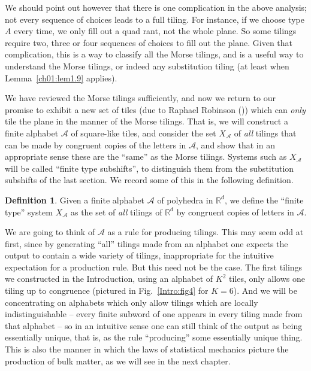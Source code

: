 \documentclass[reqno]{stml-l}
\theoremstyle{plain}
\theoremstyle{definition}
\newtheorem{definition}[theorem]{Definition}
\numberwithin{equation}{chapter}
\begin{document}
We should point out however that there is one complication in the above analysis; not every sequence of choices leads to a full tiling. For instance, if we choose type $A$ every time, we only fill out a quad rant, not the whole plane. So some tilings require two, three or four sequences of choices to fill out the plane. Given that complication, this is a way to classify all the Morse tilings, and is a useful way to understand the Morse tilings, or indeed any substitution tiling (at least when Lemma~\ref{ch01:lem1.9} applies).

We have reviewed the Morse tilings sufficiently, and now we return to our promise to exhibit a new set of tiles (due to Raphael Robinson (\cite{bib:Rob,bib:GrS})) which can \emph{only} tile the plane in the manner of the Morse tilings. That is, we will construct a finite alphabet $\mathcal{A}$ of square-like tiles, and consider the set $X_{\mathcal{A}}$ of \emph{all} tilings that can be made by congruent copies of the letters in $\mathcal{A}$, and show that in an appropriate sense these are the ``same'' as the Morse tilings. Systems such as $X_{\mathcal{A}}$ will be called ``finite type subshifts'', to distinguish them from the substitution subshifts of the last section. We record some of this in the following definition.

\begin{definition}\label{ch01:def1.9}
Given a finite alphabet $\mathcal{A}$ of polyhedra in $\mathbb{R}^{d}$, we define the ``finite type'' system $X_{\mathcal{A}}$ as the set of \emph{all} tilings of $\mathbb{R}^{d}$ by congruent copies of letters in $\mathcal{A}$.
\end{definition}

We are going to think of $\mathcal{A}$ as a rule for producing tilings. This may seem odd at first, since by generating ``all'' tilings made from an alphabet one expects the output to contain a wide variety of tilings, inappropriate for the intuitive expectation for a production rule. But this need not be the case. The first tilings we constructed in the Introduction, using an alphabet of $K^{2}$ tiles, only allows one tiling up to congruence (pictured in Fig.~\ref{Intro:fig4} for $K=6$). And we will be concentrating on alphabets which only allow tilings which are locally indistinguishable -- every finite subword of one appears in every tiling made from that alphabet -- so in an intuitive sense one can still think of the output as being essentially unique, that is, as the rule ``producing''
some essentially unique thing. This is also the manner in which the laws of statistical mechanics picture the production of bulk matter, as we will see in the next chapter.
\end{document}
